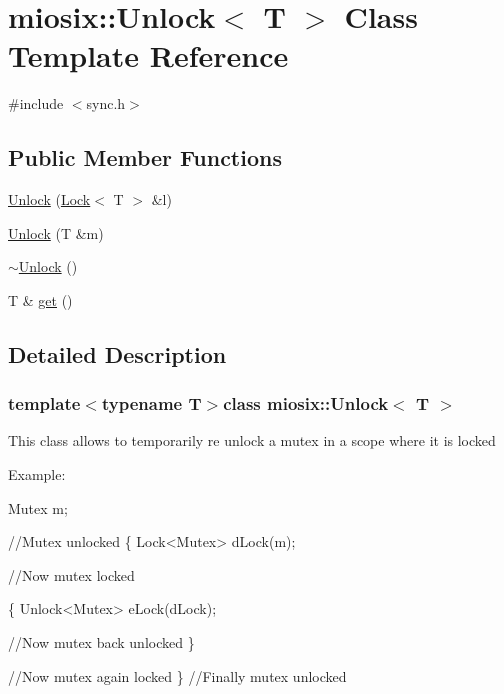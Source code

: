 \hypertarget{classmiosix_1_1_unlock}{\section{miosix\-:\-:Unlock$<$ T $>$ Class Template Reference}
\label{classmiosix_1_1_unlock}
}


{\ttfamily \#include $<$sync.\-h$>$}

\subsection*{Public Member Functions}
\begin{DoxyCompactItemize}
\item 
\hyperlink{classmiosix_1_1_unlock_a5ef3238bc134f5de60cf3ba88e3c8c3d}{Unlock} (\hyperlink{classmiosix_1_1_lock}{Lock}$<$ T $>$ \&l)
\item 
\hyperlink{classmiosix_1_1_unlock_a4c3c1864d2ba24597b2bd4913a36e248}{Unlock} (T \&m)
\item 
\hyperlink{classmiosix_1_1_unlock_a53f826f17c0c7792d296c4a8dff4fef5}{$\sim$\-Unlock} ()
\item 
T \& \hyperlink{classmiosix_1_1_unlock_a0185d0ca22404fe71d69bf831ff3266c}{get} ()
\end{DoxyCompactItemize}


\subsection{Detailed Description}
\subsubsection*{template$<$typename T$>$class miosix\-::\-Unlock$<$ T $>$}

This class allows to temporarily re unlock a mutex in a scope where it is locked \par
 Example\-: 
\begin{DoxyCode}
Mutex m;

\textcolor{comment}{//Mutex unlocked}
\{
    Lock<Mutex> dLock(m);

    \textcolor{comment}{//Now mutex locked}

    \{
        Unlock<Mutex> eLock(dLock);

        \textcolor{comment}{//Now mutex back unlocked}
    \}

    \textcolor{comment}{//Now mutex again locked}
\}
\textcolor{comment}{//Finally mutex unlocked}
\end{DoxyCode}
 

